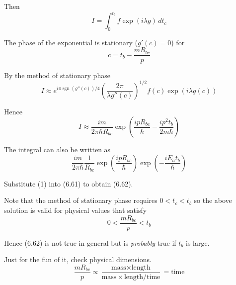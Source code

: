Then
\begin{equation*}
I=\int_0^{t_b}f\exp(i\lambda g)\,dt_c
\end{equation*}

The phase of the exponential is stationary ($g'(c)=0$) for
\begin{equation*}
c=t_b-\frac{mR_{bc}}{p}
\end{equation*}

By the method of stationary phase
\begin{equation*}
I\approx e^{i\pi\operatorname{sgn}(g''(c))/4}\left(\frac{2\pi}{\lambda g''(c)}\right)^{1/2}
f(c)\exp(i\lambda g(c))
\end{equation*}

Hence
\begin{equation*}
I\approx\frac{im}{2\pi\hbar R_{bc}}
\exp\left(\frac{ipR_{bc}}{\hbar}-\frac{ip^2t_b}{2m\hbar}\right)
\end{equation*}

The integral can also be written as
\begin{equation*}
\frac{im}{2\pi\hbar}
\frac{1}{R_{bc}}
\exp\left(\frac{ipR_{bc}}{\hbar}\right)
\exp\left(-\frac{iE_at_b}{\hbar}\right)
\tag{1}
\end{equation*}

Substitute (1) into (6.61) to obtain (6.62).

\bigskip
Note that the method of stationary phase requires $0<t_c<t_b$ so the above
solution is valid for physical values that satisfy
\begin{equation*}
0<\frac{mR_{bc}}{p}<t_b
\end{equation*}

Hence (6.62) is not true in general but is {\it probably} true if $t_b$ is large.

\bigskip
Just for the fun of it, check physical dimensions.
\begin{equation*}
\frac{mR_{bc}}{p}\propto
\frac{\text{mass}\times\text{length}}{\text{mass}\times\text{length}/\text{time}}
=\text{time}
\end{equation*}


